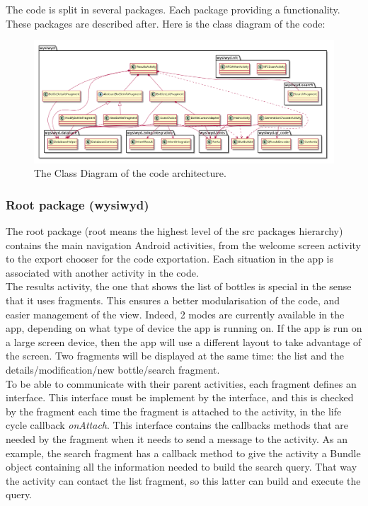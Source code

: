 The code is split in several packages. Each package providing a functionality. These packages are described after. Here is the class diagram of the code:
\begin{landscape}
\begin{figure}[H]
\begin{center}
	\includegraphics[width=\textwidth]{Images/ClassDiagram.png}
	\caption{The Class Diagram of the code architecture.}
\end{center}
\end{figure}
\end{landscape}
\subsubsection{Root package (wysiwyd)}

The root package (root means the highest level of the src packages hierarchy) contains the main navigation Android activities, from the welcome screen activity to the export chooser for the code exportation. Each situation in the app is associated with another activity in the code.\\

The results activity, the one that shows the list of bottles is special in the sense that it uses fragments. This ensures a better modularisation of the code, and easier management of the view. Indeed, 2 modes are currently available in the app, depending on what type of device the app is running on. If the app is run on a large screen device, then the app will use a different layout to take advantage of the screen. Two fragments will be displayed at the same time: the list and the details/modification/new bottle/search fragment.\\

To be able to communicate with their parent activities, each fragment defines an interface. This interface must be implement by the interface, and this is checked by the fragment each time the fragment is attached to the activity, in the life cycle callback \emph{onAttach}. This interface contains the callbacks methods that are needed by the fragment when it needs to send a message to the activity. As an example, the search fragment has a callback method to give the activity a Bundle object containing all the information needed to build the search query. That way the activity can contact the list fragment, so this latter can build and execute the query.\\

